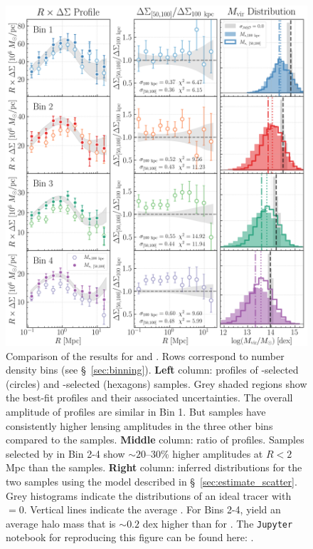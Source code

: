 \documentclass[fleqn,usenatbib,useAMS]{mnras}
\begin{document}
\begin{CJK*}{UTF8}{gbsn}
\begin{figure}
    \centering
    \includegraphics[width=\textwidth]{figure/fig_6}
    \caption{
        Comparison of the \topn{} results for  and . 
        Rows correspond to number density bins (see \S\ \ref{sec:binning}).  
        \textbf{Left} column: \rdsigma{} profiles of -selected (circles) and
        -selected (hexagons) samples. 
        Grey shaded regions show the best-fit profiles and their associated uncertainties. 
        The overall amplitude of \dsigma{} profiles are similar in Bin 1.
        But  samples have consistently higher lensing amplitudes in the three other
        bins compared to the  samples. 
        \textbf{Middle} column: ratio of \dsigma{} profiles. 
        Samples selected by  in Bin 2-4 show $\sim 20$--30\% higher \dsigma{}
        amplitudes at $R<2$ Mpc than the  samples. 
        \textbf{Right} column: inferred \mvir{} distributions for the two samples using the model
        described in \S\ \ref{sec:estimate_scatter}. 
        Grey histograms indicate the \mvir{} distributions of an ideal tracer with 
        \scatterMhaloObsSym{}{}$=0$.
        Vertical lines indicate the average \mvir{}. 
        For Bins 2-4,  yield an average halo mass that is $\sim 0.2$ dex higher than
        for .
        The \texttt{Jupyter} notebook for reproducing this figure can be found here:
        \href{https://github.com/dr-guangtou/jianbing/blob/master/notebooks/figure/fig6.ipynb}{\faGithub}.
    }
    \label{fig:m100_mout}
\end{figure}


\end{CJK*}
\end{document}
